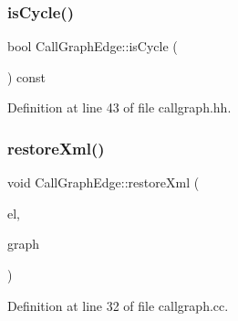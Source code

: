 \mbox{\label{class_call_graph_edge_a5d3d7832cb31183a683927c5cf099a61}} 
\subsubsection{\texorpdfstring{isCycle()}{isCycle()}}
{\footnotesize\ttfamily bool Call\+Graph\+Edge\+::is\+Cycle (\begin{DoxyParamCaption}\item[{void}]{ }\end{DoxyParamCaption}) const\hspace{0.3cm}{\ttfamily [inline]}}



Definition at line 43 of file callgraph.\+hh.

\mbox{\label{class_call_graph_edge_ab1136dde3188c5d224fbfb33ecc7cda7}} 
\subsubsection{\texorpdfstring{restoreXml()}{restoreXml()}}
{\footnotesize\ttfamily void Call\+Graph\+Edge\+::restore\+Xml (\begin{DoxyParamCaption}\item[{const \mbox{\hyperlink{class_element}{Element}} $\ast$}]{el,  }\item[{\mbox{\hyperlink{class_call_graph}{Call\+Graph}} $\ast$}]{graph }\end{DoxyParamCaption})\hspace{0.3cm}{\ttfamily [static]}}



Definition at line 32 of file callgraph.\+cc.

